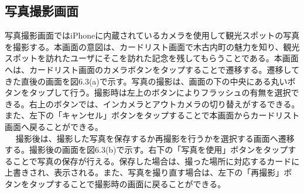 \subsection{写真撮影画面}
写真撮影画面ではiPhoneに内蔵されているカメラを使用して観光スポットの写真を撮影する。本画面の意図は、カードリスト画面で木古内町の魅力を知り、観光スポットを訪れたユーザにそこを訪れた記念を残してもらうことである。本画面へは、カードリスト画面のカメラボタンをタップすることで遷移する。遷移してきた直後の画面を図6.3(a)で示す。写真の撮影は、画面の下の中央にある丸いボタンをタップして行う。撮影時は左上のボタンによりフラッシュの有無を選択できる。右上のボタンでは、インカメラとアウトカメラの切り替えがするできる。また、左下の「キャンセル」ボタンをタップすることで本画面からカードリスト画面へ戻ることができる。\\　
撮影後は、撮影した写真を保存するか再撮影を行うかを選択する画面へ遷移する。撮影後の画面を図6.3(b)で示す。右下の「写真を使用」ボタンをタップすることで写真の保存が行える。保存した場合は、撮った場所に対応するカードに上書きされ、表示される。また、写真を撮り直す場合は、左下の「再撮影」ボタンをタップすることで撮影時の画面に戻ることができる。
\newpage


